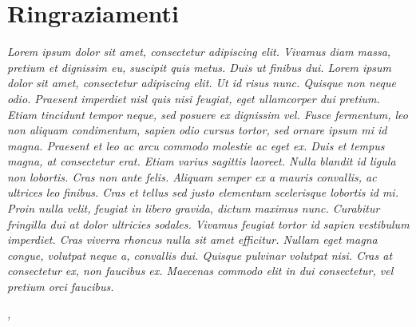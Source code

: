 \cleardoublepage
{}
{}

\bigskip

\begingroup
\let\clearpage\relax
\let\cleardoublepage\relax
\let\cleardoublepage\relax

\chapter*{Ringraziamenti}

\noindent \textit{Lorem ipsum dolor sit amet, consectetur adipiscing elit. Vivamus diam massa, pretium et dignissim eu, suscipit quis metus. Duis ut finibus dui. Lorem ipsum dolor sit amet, consectetur adipiscing elit. Ut id risus nunc. Quisque non neque odio. Praesent imperdiet nisl quis nisi feugiat, eget ullamcorper dui pretium. Etiam tincidunt tempor neque, sed posuere ex dignissim vel. Fusce fermentum, leo non aliquam condimentum, sapien odio cursus tortor, sed ornare ipsum mi id magna. Praesent et leo ac arcu commodo molestie ac eget ex. Duis et tempus magna, at consectetur erat. Etiam varius sagittis laoreet. Nulla blandit id ligula non lobortis. Cras non ante felis. Aliquam semper ex a mauris convallis, ac ultrices leo finibus. Cras et tellus sed justo elementum scelerisque lobortis id mi.}\\

\noindent \textit{Proin nulla velit, feugiat in libero gravida, dictum maximus nunc. Curabitur fringilla dui at dolor ultricies sodales. Vivamus feugiat tortor id sapien vestibulum imperdiet. Cras viverra rhoncus nulla sit amet efficitur. Nullam eget magna congue, volutpat neque a, convallis dui. Quisque pulvinar volutpat nisi. Cras at consectetur ex, non faucibus ex. Maecenas commodo elit in dui consectetur, vel pretium orci faucibus.}\\

\bigskip

\noindent\textit{\myLocation, \myTime}
\hfill \myName

\endgroup
